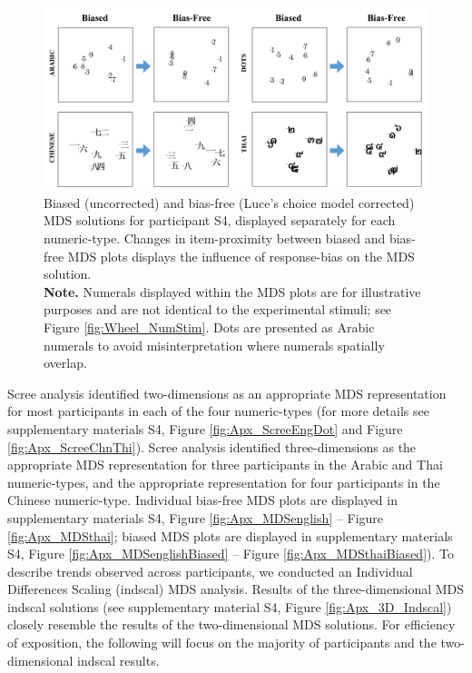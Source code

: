 \begin{figure}[tbh]
\centering \includegraphics[scale = .48]{Figures/Wheel/BiasToUnbiasSingle.jpg}
\caption{Biased (uncorrected) and bias-free (Luce's choice model corrected) MDS solutions for participant S4, displayed separately for each numeric-type. Changes in item-proximity between biased and bias-free MDS plots displays the influence of response-bias on the MDS solution. \\\textbf{Note.} Numerals displayed within the MDS plots are for illustrative purposes and are not identical to the experimental stimuli; see Figure \ref{fig:Wheel_NumStim}. Dots are presented as Arabic numerals to avoid misinterpretation where numerals spatially overlap.}
\label{fig:Bias2Unbias}
\end{figure}

Scree analysis identified two-dimensions as an appropriate MDS representation for most participants in each of the four numeric-types (for more details see supplementary materials S4, Figure \ref{fig:Apx_ScreeEngDot} and Figure \ref{fig:Apx_ScreeChnThi}). Scree analysis identified three-dimensions as the appropriate MDS representation for three participants in the Arabic and Thai numeric-types, and the appropriate representation for four participants in the Chinese numeric-type. Individual bias-free MDS plots are displayed in supplementary materials S4, Figure \ref{fig:Apx_MDSenglish} -- Figure \ref{fig:Apx_MDSthai}; biased MDS plots are displayed in supplementary materials S4, Figure \ref{fig:Apx_MDSenglishBiased} -- Figure \ref{fig:Apx_MDSthaiBiased}). To describe trends observed across participants, we conducted an Individual Differences Scaling (indscal) MDS analysis. Results of the three-dimensional MDS indscal solutions (see supplementary material S4, Figure \ref{fig:Apx_3D_Indscal}) closely resemble the results of the two-dimensional MDS solutions. For efficiency of exposition, the following will focus on the majority of participants and the two-dimensional indscal results.


